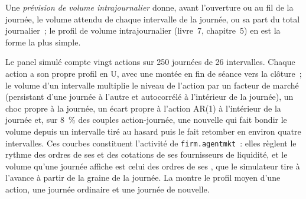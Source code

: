 \begin{definition}\label{def:mx:benchmark-algorithms:forecast}
Une \emph{prévision de volume intrajournalier} donne, avant l'ouverture ou au fil de la journée, le volume attendu de chaque intervalle
de la journée, ou sa part du total journalier~; le profil de volume intrajournalier (livre~7, chapitre~5) en est la forme la plus simple.
\end{definition}

Le panel simulé compte vingt actions sur 250 journées de 26 intervalles. Chaque action a son propre profil en U, avec une montée en fin de séance vers la clôture~; le volume d'un
intervalle multiplie le niveau de l'action par un facteur de marché (persistant d'une journée à l'autre et autocorrélé à l'intérieur de la journée), un choc propre à la journée, un écart propre à l'action
AR(1) à l'intérieur de la journée et, sur 8~\% des couples action-journée, une nouvelle qui fait bondir le volume depuis un intervalle tiré au hasard puis le fait retomber en environ quatre intervalles. Ces
courbes constituent l'activité de \texttt{firm.agentmkt}~: elles règlent le rythme des ordres de ses  et des cotations de ses fournisseurs de liquidité, et le volume
qu'une journée affiche est celui des ordres de ses , que le simulateur tire à l'avance à partir de la graine de la journée. La  montre
le profil moyen d'une action, une journée ordinaire et une journée de nouvelle.

